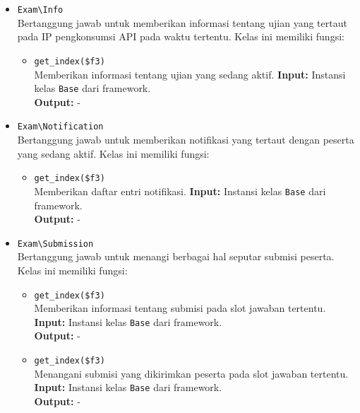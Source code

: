 \begin{itemize}
        \item \texttt{Exam\textbackslash Info} \\
            Bertanggung jawab untuk memberikan informasi tentang ujian yang
            tertaut pada IP pengkonsumsi API pada waktu tertentu. Kelas ini
            memiliki fungsi:
            \begin{itemize}
                \item \texttt{get\_index(\$f3)} \\
                    Memberikan informasi tentang ujian yang sedang aktif.
                    \textbf{Input:} Instansi kelas \texttt{Base} dari
                    framework.\\
                    \textbf{Output:} -
            \end{itemize}
            
        \item \texttt{Exam\textbackslash Notification} \\
            Bertanggung jawab untuk memberikan notifikasi yang tertaut dengan
            peserta yang sedang aktif. Kelas ini memiliki fungsi:
            \begin{itemize}
                \item \texttt{get\_index(\$f3)} \\
                    Memberikan daftar entri notifikasi. \textbf{Input:} Instansi
                    kelas \texttt{Base} dari framework.\\
                    \textbf{Output:} -
            \end{itemize}
            
        \item \texttt{Exam\textbackslash Submission} \\
            Bertanggung jawab untuk menangi berbagai hal seputar submisi
            peserta. Kelas ini memiliki fungsi:
            \begin{itemize}
                \item \texttt{get\_index(\$f3)} \\
                    Memberikan informasi tentang submisi pada slot jawaban
                    tertentu. \textbf{Input:} Instansi kelas \texttt{Base} dari
                    framework.\\
                    \textbf{Output:} -
                    
                \item \texttt{get\_index(\$f3)} \\
                    Menangani submisi yang dikirimkan peserta pada slot jawaban
                    tertentu. \textbf{Input:} Instansi kelas \texttt{Base} dari
                    framework.\\
                    \textbf{Output:} -
            \end{itemize}
            

\end{itemize}
